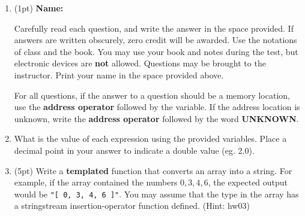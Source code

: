 \documentclass{article}
\newcommand*{\pts}[1]{\addtocounter{points}{#1}(#1pt)}
\begin{document}
\begin{spacing}{1.4}

\begin{enumerate}[leftmargin=*]
\item \pts{1} \textbf{Name:} \hrulefill

Carefully read each question, and write the answer in the space
provided.  If answers are written obscurely, zero credit will be
awarded. Use the notations of class and the book. You may use your
book and notes during the test, but electronic devices are
\textbf{not} allowed. Questions may be brought to the
instructor. Print your name in the space provided above.

For all questions, if the answer to a question should be a memory
location, use the \textbf{address operator} followed by the
variable. If the address location is unknown, write the
\textbf{address operator} followed by the word \textbf{UNKNOWN}.
  

\item What is the value of each expression using the provided
  variables. Place a decimal point in your answer to indicate a double
  value (eg. 2.0).



\item \pts{5} Write a \textbf{templated} function that converts an
  array into a string.  For example, if the array contained the
  numbers $0,3,4,6$, the expected output would be \lstinline$"[ 0, 3, 4, 6 ]"$. 
  You may assume that the type in the array has a
  stringstream insertion-operator function defined. (Hint: hw03)


\end{enumerate}
\end{spacing}
\end{document}
